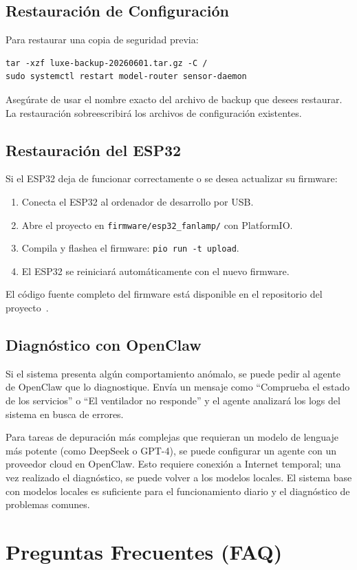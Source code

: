 \subsection{Restauración de Configuración}
Para restaurar una copia de seguridad previa:
\begin{verbatim}
tar -xzf luxe-backup-20260601.tar.gz -C /
sudo systemctl restart model-router sensor-daemon
\end{verbatim}
Asegúrate de usar el nombre exacto del archivo de backup que desees restaurar. La restauración sobreescribirá los archivos de configuración existentes.

\subsection{Restauración del ESP32}
Si el ESP32 deja de funcionar correctamente o se desea actualizar su firmware:
\begin{enumerate}
    \item Conecta el ESP32 al ordenador de desarrollo por USB.
    \item Abre el proyecto en \texttt{firmware/esp32\_fanlamp/} con PlatformIO.
    \item Compila y flashea el firmware: \texttt{pio run -t upload}.
    \item El ESP32 se reiniciará automáticamente con el nuevo firmware.
\end{enumerate}
El código fuente completo del firmware está disponible en el repositorio del proyecto~\cite{repo_publico}.

\subsection{Diagnóstico con OpenClaw}
Si el sistema presenta algún comportamiento anómalo, se puede pedir al agente de OpenClaw que lo diagnostique. Envía un mensaje como ``Comprueba el estado de los servicios'' o ``El ventilador no responde'' y el agente analizará los logs del sistema en busca de errores.

Para tareas de depuración más complejas que requieran un modelo de lenguaje más potente (como DeepSeek o GPT-4), se puede configurar un agente con un proveedor cloud en OpenClaw. Esto requiere conexión a Internet temporal; una vez realizado el diagnóstico, se puede volver a los modelos locales. El sistema base con modelos locales es suficiente para el funcionamiento diario y el diagnóstico de problemas comunes.

\section{Preguntas Frecuentes (FAQ)}

